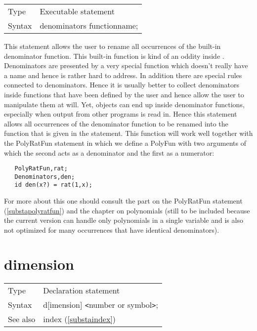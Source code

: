 \noindent \begin{tabular}{ll}
Type & Executable statement\\
Syntax & denominators functionname;
\end{tabular} \vspace{4mm}

\noindent This statement allows the user to rename all 
occurrences of the built-in denominator function. This built-in function is 
kind of an oddity inside \FORM. Denominators are presented by a very special 
function which doesn't really have a name and hence is rather hard to 
address. In addition there are special rules connected to denominators. 
Hence it is usually better to collect denominators inside functions that 
have been defined by the user and hence allow the user to manipulate them 
at will. Yet, objects can end up inside denominator functions, especially 
when output from other programs is read in. Hence this statement allows all 
occurrences of the denominator function to be renamed into the function 
that is given in the statement. This function will work well together with 
the PolyRatFun statement in which we define a PolyFun with two arguments of 
which the second acts as a denominator and the first as a numerator:
\begin{verbatim}
   PolyRatFun,rat;
   Denominators,den;
   id den(x?) = rat(1,x);
\end{verbatim}
For more about this one should consult the part on the 
PolyRatFun statement 
(\ref{substapolyratfun}) and the chapter on polynomials (still to be 
included because the current version can handle only polynomials in a 
single variable and is also not optimized for many occurrences that have 
identical denominators).
\vspace{10mm}

 
\section{dimension}
\label{substadimension}

\noindent \begin{tabular}{ll}
Type & Declaration statement\\
Syntax & d[imension] {\tt<}number or symbol{\tt>};
\\ See also & index (\ref{substaindex})
\end{tabular} \vspace{4mm}

